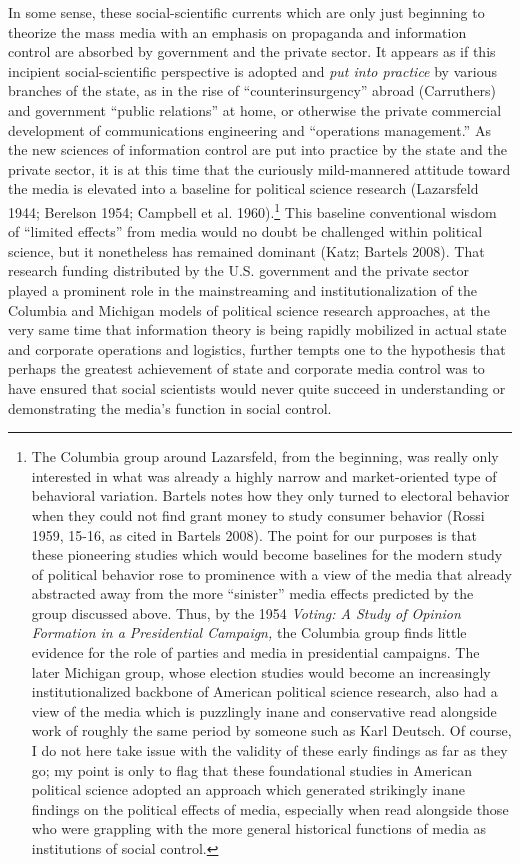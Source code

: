 \documentclass[12pt,book]{article}
\begin{document}
In some sense, these social-scientific currents which are only just
beginning to theorize the mass media with an emphasis on propaganda and
information control are absorbed by government and the private sector.
It appears as if this incipient social-scientific perspective is adopted
and \emph{put into practice} by various branches of the state, as in the
rise of ``counterinsurgency'' abroad (Carruthers) and government
``public relations'' at home, or otherwise the private commercial
development of communications engineering and ``operations management.''
As the new sciences of information control are put into practice by the
state and the private sector, it is at this time that the curiously
mild-mannered attitude toward the media is elevated into a baseline for
political science research (Lazarsfeld 1944; Berelson 1954; Campbell et
al. 1960).\footnote{The Columbia group around Lazarsfeld, from the
  beginning, was really only interested in what was already a highly
  narrow and market-oriented type of behavioral variation. Bartels notes
  how they only turned to electoral behavior when they could not find
  grant money to study consumer behavior (Rossi 1959, 15-16, as cited in
  Bartels 2008). The point for our purposes is that these pioneering
  studies which would become baselines for the modern study of political
  behavior rose to prominence with a view of the media that already
  abstracted away from the more ``sinister'' media effects predicted by
  the group discussed above. Thus, by the 1954 \emph{Voting: A Study of
  Opinion Formation in a Presidential Campaign, }the Columbia group
  finds little evidence for the role of parties and media in
  presidential campaigns. The later Michigan group, whose election
  studies would become an increasingly institutionalized backbone of
  American political science research, also had a view of the media
  which is puzzlingly inane and conservative read alongside work of
  roughly the same period by someone such as Karl Deutsch. Of course, I
  do not here take issue with the validity of these early findings as
  far as they go; my point is only to flag that these foundational
  studies in American political science adopted an approach which
  generated strikingly inane findings on the political effects of media,
  especially when read alongside those who were grappling with the more
  general historical functions of media as institutions of social
  control.} This baseline conventional wisdom of ``limited effects''
from media would no doubt be challenged within political science, but it
nonetheless has remained dominant (Katz; Bartels 2008). That research
funding distributed by the U.S. government and the private sector played
a prominent role in the mainstreaming and institutionalization of the
Columbia and Michigan models of political science research approaches,
at the very same time that information theory is being rapidly mobilized
in actual state and corporate operations and logistics, further tempts
one to the hypothesis that perhaps the greatest achievement of state and
corporate media control was to have ensured that social scientists would
never quite succeed in understanding or demonstrating the media's
function in social control.
\end{document}
